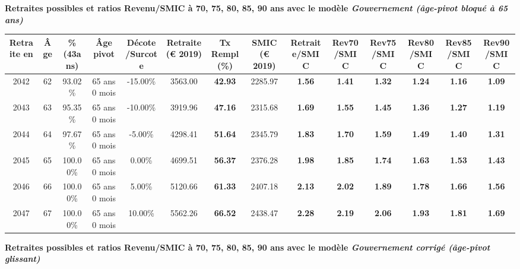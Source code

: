 {\bf \noindent Retraites possibles et ratios Revenu/SMIC à 70, 75, 80, 85, 90 ans avec le modèle \emph{Gouvernement (âge-pivot bloqué à 65 ans)}}  
 
\begin{adjustbox}{max width=\textwidth} 
\begin{tabular}[htb]{|c|c||c|c|c||c|c||c||c|c|c|c|c|c|} 
\hline 
 Retraite en &  Âge &  \%(43ans) &  Âge pivot &  Décote/Surcote &  Retraite (\euro{} 2019) &  Tx Rempl(\%) &  SMIC (\euro{} 2019) &  Retraite/SMIC &  Rev70/SMIC &  Rev75/SMIC &  Rev80/SMIC &  Rev85/SMIC &  Rev90/SMIC \\ 
\hline \hline 
 2042 &  62 &  93.02\% &  65 ans 0 mois &  -15.00\% &  3563.00 &  {\bf 42.93} &  2285.97 &  {\bf 1.56} &  {\bf 1.41} &  {\bf 1.32} &  {\bf 1.24} &  {\bf 1.16} &  {\bf 1.09} \\ 
\hline 
 2043 &  63 &  95.35\% &  65 ans 0 mois &  -10.00\% &  3919.96 &  {\bf 47.16} &  2315.68 &  {\bf 1.69} &  {\bf 1.55} &  {\bf 1.45} &  {\bf 1.36} &  {\bf 1.27} &  {\bf 1.19} \\ 
\hline 
 2044 &  64 &  97.67\% &  65 ans 0 mois &  -5.00\% &  4298.41 &  {\bf 51.64} &  2345.79 &  {\bf 1.83} &  {\bf 1.70} &  {\bf 1.59} &  {\bf 1.49} &  {\bf 1.40} &  {\bf 1.31} \\ 
\hline 
 2045 &  65 &  100.00\% &  65 ans 0 mois &  0.00\% &  4699.51 &  {\bf 56.37} &  2376.28 &  {\bf 1.98} &  {\bf 1.85} &  {\bf 1.74} &  {\bf 1.63} &  {\bf 1.53} &  {\bf 1.43} \\ 
\hline 
 2046 &  66 &  100.00\% &  65 ans 0 mois &  5.00\% &  5120.66 &  {\bf 61.33} &  2407.18 &  {\bf 2.13} &  {\bf 2.02} &  {\bf 1.89} &  {\bf 1.78} &  {\bf 1.66} &  {\bf 1.56} \\ 
\hline 
 2047 &  67 &  100.00\% &  65 ans 0 mois &  10.00\% &  5562.26 &  {\bf 66.52} &  2438.47 &  {\bf 2.28} &  {\bf 2.19} &  {\bf 2.06} &  {\bf 1.93} &  {\bf 1.81} &  {\bf 1.69} \\ 
\hline 
\hline 
\end{tabular} 
\end{adjustbox} 
 
 \vspace{0.1cm} 
{\bf \noindent Retraites possibles et ratios Revenu/SMIC à 70, 75, 80, 85, 90 ans avec le modèle \emph{Gouvernement corrigé (âge-pivot glissant)}}  
 

